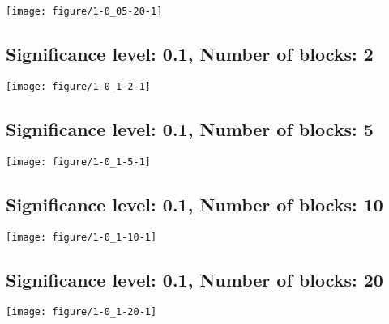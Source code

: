 \documentclass[11pt,letter]{article}\usepackage[]{graphicx}\usepackage[]{color}
\makeatletter
\def\maxwidth{ %
  \ifdim\Gin@nat@width>\linewidth
    \linewidth
  \else
    \Gin@nat@width
  \fi
}
\newenvironment{knitrout}{}{} %
\makeatother
\begin{document}
\begin{knitrout}
\color{fgcolor}
\texttt{[image: figure/1-0\_05-20-1]} 

\end{knitrout}

\newpage
\subsection{Significance level: 0.1, Number of blocks: 2}

\begin{knitrout}
\color{fgcolor}
\texttt{[image: figure/1-0\_1-2-1]} 

\end{knitrout}

\newpage
\subsection{Significance level: 0.1, Number of blocks: 5}

\begin{knitrout}
\color{fgcolor}
\texttt{[image: figure/1-0\_1-5-1]} 

\end{knitrout}

\newpage
\subsection{Significance level: 0.1, Number of blocks: 10}

\begin{knitrout}
\color{fgcolor}
\texttt{[image: figure/1-0\_1-10-1]} 

\end{knitrout}

\newpage
\subsection{Significance level: 0.1, Number of blocks: 20}

\begin{knitrout}
\color{fgcolor}
\texttt{[image: figure/1-0\_1-20-1]} 

\end{knitrout}
\end{document}

